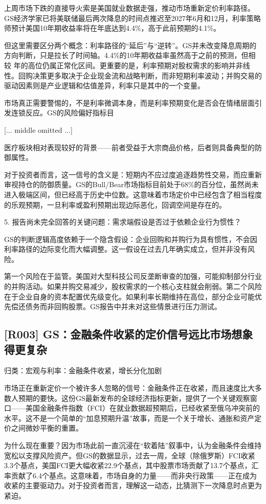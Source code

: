 \documentclass[11pt]{ctexart}
\begin{document}
上周市场下跌的直接导火索是美国就业数据走强，推动市场重新定价利率路径。GS经济学家已将美联储最后两次降息的时间点推迟至2027年6月和12月，利率策略师预计美国10年期收益率将在年底达到4.4\%，高于此前预期的4.1\%。

但这里需要区分两个概念：利率路径的“延后”与“逆转”。GS并未改变降息周期的方向判断，只是拉长了时间轴。4.4\%的10年期收益率虽然高于之前的预测，但相较 年的高位仍属正常化区间。更重要的是，利率预期对股权需求的影响并非线性。回购决策更多取决于企业现金流和战略判断，而非短期利率波动；并购交易的驱动因素则是产业逻辑和估值差异，利率只是其中的一个变量。

市场真正需要警惕的，不是利率微调本身，而是利率预期变化是否会在情绪层面引发连锁反应。GS的风险偏好指标目

[... middle omitted ...]

医疗板块相对表现较好的背景——前者受益于大宗商品价格，后者则具备典型的防御属性。

对于投资者而言，这一信号的含义是：短期内不应过度追逐趋势性交易，而应重新审视持仓的防御质量。GS的Bull/Bear市场指标目前处于68\%的百分位，虽然尚未进入极端区间，但已经高于历史中位数。这意味着市场定价中已经包含了相当程度的乐观预期，一旦利率或盈利预期出现边际恶化，回调空间是存在的。

5. 报告尚未完全回答的关键问题：需求端假设是否过于依赖企业行为惯性？

GS的判断逻辑高度依赖于一个隐含假设：企业回购和并购行为具有惯性，不会因利率路径的边际变化而大幅调整。这一假设在过去几年确实成立，但并非没有风险。

第一个风险在于监管。美国对大型科技公司反垄断审查的加强，可能抑制部分行业的并购活动。如果并购交易减少，股权需求的一个核心支柱就会削弱。第二个风险在于企业自身的资本配置优先级变化。如果利率长期维持在高位，部分企业可能优先偿还债务而非回购股票。GS报告中并未对这些情景进行压力测试。

\subsection{[R003] GS：金融条件收紧的定价信号远比市场想象得更复杂}
{\small\color{refgray}归类：宏观与利率：金融条件收紧，增长分化加剧}

市场正在重新定价一个被许多人忽略的信号：金融条件正在收紧，而且速度比大多数人预期的要快。这份GS最新发布的全球经济指标更新，提供了一个关键观察窗口——美国金融条件指数（FCI）在就业数据超预期后，已经收紧至俄乌冲突前的水平。这不是一个简单的“加息预期升温”故事，而是一个关于增长、通胀和资产定价之间微妙平衡的重置。

为什么现在重要？因为市场此前一直沉浸在“软着陆”叙事中，认为金融条件会维持宽松以支撑风险资产。但GS的数据显示，过去一周，全球（除俄罗斯）FCI收紧3.3个基点，美国FCI更大幅收紧22.9个基点，其中股票市场贡献了13.7个基点，汇率贡献了6.4个基点。这意味着，市场自身的力量——而非央行政策——正在成为收紧的主要驱动力。对于投资者而言，理解这一动态，比猜测下一次降息时点更为紧迫。
\end{document}
